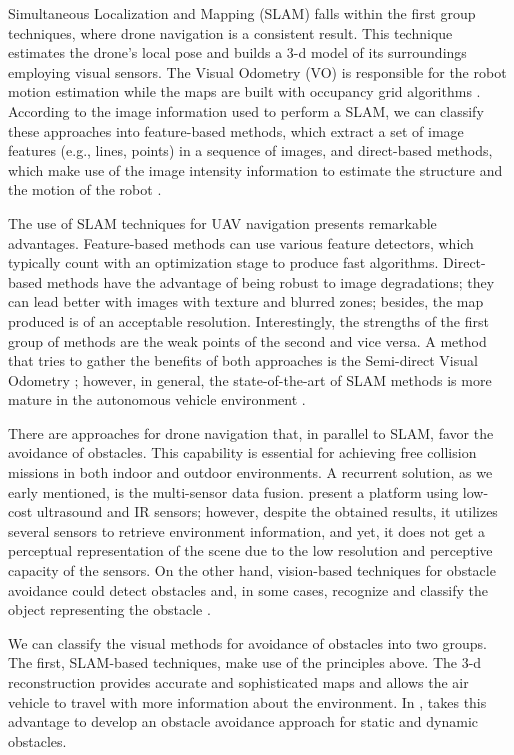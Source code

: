 Simultaneous Localization and Mapping (SLAM) falls within the first group techniques, where drone navigation is a consistent result. This technique estimates the drone's local pose and builds a 3-d model of its surroundings employing visual sensors.  The Visual Odometry (VO) \citep{Scaramuzza.Fraundorfer:RAM:2011} is responsible for the robot motion estimation while the maps are built with occupancy grid algorithms \citep{Thrun.Bu:AI:1996}. According to the image information used to perform a SLAM, we can classify these approaches into feature-based methods, which extract a set of image features (e.g., lines, points) in a sequence of images, and direct-based methods, which make use of the image intensity information to estimate the structure and the motion of the robot \citep{Taketomi.Uchiyama.ea:TCVA:2017}.

The use of SLAM techniques for UAV navigation presents remarkable advantages. Feature-based methods can use various feature detectors, which typically count with an optimization stage to produce fast algorithms. Direct-based methods have the advantage of being robust to image degradations; they can lead better with images with texture and blurred zones; besides, the map produced is of an acceptable resolution. Interestingly, the strengths of the first group of methods are the weak points of the second and vice versa. A method that tries to gather the benefits of both approaches is the Semi-direct Visual Odometry \citep{Forster.Pizzoli.ea:ICRA:2014}; however, in general, the state-of-the-art of SLAM methods is more mature in the autonomous vehicle environment \citep{Singandhupe.La:IRC:2019}.

There are approaches for drone navigation that, in parallel to SLAM, favor the avoidance of obstacles. This capability is essential for achieving free collision missions in both indoor and outdoor environments. A recurrent solution, as we early mentioned, is the multi-sensor data fusion. \cite{Gageik.Benz.ea:ACCESS:2015} present a platform using low-cost ultrasound and IR sensors; however, despite the obtained results, it utilizes several sensors to retrieve environment information, and yet, it does not get a perceptual representation of the scene due to the low resolution and perceptive capacity of the sensors. On the other hand, vision-based techniques for obstacle avoidance could detect obstacles and, in some cases, recognize and classify the object representing the obstacle \citep{Li.Ye.ea:IROS:2016}. 

We can classify the visual methods for avoidance of obstacles into two groups. The first, SLAM-based techniques, make use of the principles above. The 3-d reconstruction provides accurate and sophisticated maps and allows the air vehicle to travel with more information about the environment. In \citep{Moreno-Armendariz.Calvo:ICMEAE:2014}, takes this advantage to develop an obstacle avoidance approach for static and dynamic obstacles.

